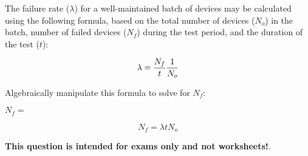 

The failure rate ($\lambda$) for a well-maintained batch of devices may be calculated using the following formula, based on the total number of devices ($N_o$) in the batch, number of failed devices ($N_f$) during the test period, and the duration of the test ($t$):

$$\lambda = {N_f \over t} {1 \over N_o}$$

Algebraically manipulate this formula to solve for $N_f$:

\vskip 20pt

$N_f = $







$$N_f = \lambda t N_o$$







{\bf This question is intended for exams only and not worksheets!}.



